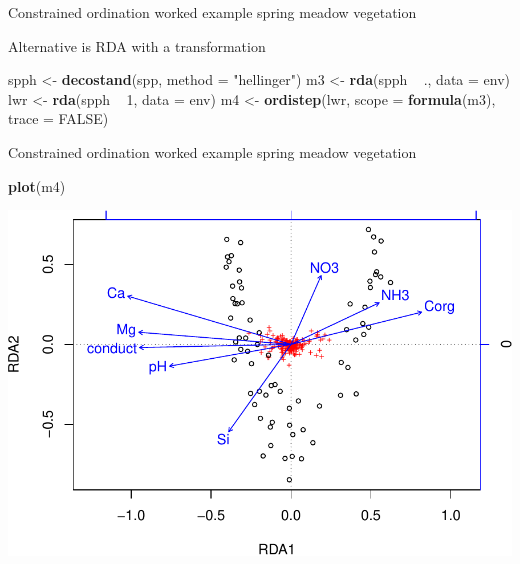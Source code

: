 \documentclass[10pt,ignorenonframetext,compress, aspectratio=169]{beamer}
\newenvironment{Shaded}{\begin{snugshade}}{\end{snugshade}}
\newcommand{\KeywordTok}[1]{\textcolor[rgb]{0.13,0.29,0.53}{\textbf{{#1}}}}
\newcommand{\DataTypeTok}[1]{\textcolor[rgb]{0.13,0.29,0.53}{{#1}}}
\newcommand{\DecValTok}[1]{\textcolor[rgb]{0.00,0.00,0.81}{{#1}}}
\newcommand{\StringTok}[1]{\textcolor[rgb]{0.31,0.60,0.02}{{#1}}}
\newcommand{\OtherTok}[1]{\textcolor[rgb]{0.56,0.35,0.01}{{#1}}}
\newcommand{\NormalTok}[1]{{#1}}
\begin{document}
\begin{frame}[fragile]{Constrained ordination worked example \textbar{}
spring meadow vegetation}

Alternative is RDA with a transformation

\scriptsize

\begin{Shaded}
\begin{Highlighting}[]
\NormalTok{spph <-}\StringTok{ }\KeywordTok{decostand}\NormalTok{(spp, }\DataTypeTok{method =} \StringTok{"hellinger"}\NormalTok{)}
\NormalTok{m3 <-}\StringTok{ }\KeywordTok{rda}\NormalTok{(spph ~}\StringTok{ }\NormalTok{., }\DataTypeTok{data =} \NormalTok{env)}
\NormalTok{lwr <-}\StringTok{ }\KeywordTok{rda}\NormalTok{(spph ~}\StringTok{ }\DecValTok{1}\NormalTok{, }\DataTypeTok{data =} \NormalTok{env)}
\NormalTok{m4 <-}\StringTok{ }\KeywordTok{ordistep}\NormalTok{(lwr, }\DataTypeTok{scope =} \KeywordTok{formula}\NormalTok{(m3), }\DataTypeTok{trace =} \OtherTok{FALSE}\NormalTok{)}
\end{Highlighting}
\end{Shaded}

\normalsize

\end{frame}

\begin{frame}[fragile]{Constrained ordination worked example \textbar{}
spring meadow vegetation}

\scriptsize

\begin{Shaded}
\begin{Highlighting}[]
\KeywordTok{plot}\NormalTok{(m4)}
\end{Highlighting}
\end{Shaded}

\begin{center}\includegraphics[width=0.5\linewidth]{vegan-constrained-slides_files/figure-beamer/meadows-rda-reduced-triplot-1} \end{center}

\normalsize

\end{frame}
\end{document}
